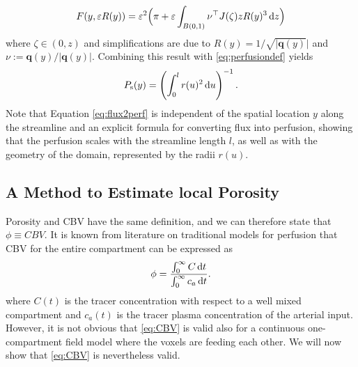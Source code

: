 \documentclass[journal,twocolumn]{IEEEtran}
\newcommand{\Perfs}{P_{\mathrm{s}}}
\newcommand{\vq}{\mathbf{q}}
\begin{document}
	\begin{equation}
		F(y,\varepsilon R(y))
		= \varepsilon^2 \Big(\pi + \varepsilon \int_{B(0,1)} \nu^\top J(\zeta)zR(y)^3 \,\mathrm{d} z\Big)
	\end{equation}
	where $\zeta \in (0,z)$ and simplifications are due to $R(y) = 1/\sqrt{\vert \vq(y)} \vert$ and $\nu:=\vq(y)/\vert \vq(y) \vert$.
	Combining this result with \eqref{eq:perfusiondef} yields
	\begin{equation}\label{eq:flux2perf}
		\Perfs(y) = \left(\int_0^l r(u)^2 \diffint u\right)^{-1}.
	\end{equation}
	Note that Equation \eqref{eq:flux2perf} is independent of the spatial location $y$ along the streamline and an explicit formula for converting flux into perfusion, showing that the perfusion scales with the streamline length $l$, as well as with the geometry of the domain, represented by the radii $r(u)$.


	\subsection{A Method to Estimate local Porosity}\label{sec:CBV}

	Porosity and CBV have the same definition, and we can therefore state that $\phi \equiv CBV$. It is known from literature on traditional models \cite{sourbron13} for perfusion that CBV for the entire compartment can be expressed as
	\begin{equation}
		\phi = \frac{\int_0^\infty C \diffint t}{\int_0^\infty c_a \diffint t}.
		\label{eq:CBV}
	\end{equation}
	where $C(t)$ is the tracer concentration with respect to a well mixed compartment and $c_a(t)$ is the tracer plasma concentration of the arterial input. 
	However, it is not obvious that \eqref{eq:CBV} is valid also for a continuous one-compartment field model where the voxels are feeding each other. We will now show that \eqref{eq:CBV} is nevertheless valid.
\end{document}
